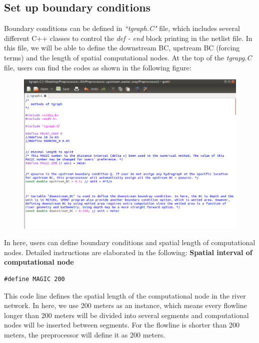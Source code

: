 \documentclass[12pt, letterpaper]{article}
\begin{document}
\begin{appendices}
\begin{flushleft}
\subsection*{Set up boundary conditions}
Boundary conditions can be defined in \emph{``tgraph.C"} file, which includes several different C++ classes to control the \emph{def - end} block printing in the netlist file. In this file, we will be able to define the downstream BC, upstream BC (forcing terms) and the length of spatial computational nodes.
\newline
\newline
At the top of the \emph{tgrapg.C} file, users can find the codes as shown in the following figure:
\begin{figure}[H]
	\centering
	\includegraphics[width = 1.0\textwidth]{figure/tgraph.png} %
	\label{fig:process}%
\end{figure}
\newpage
In here, users can define boundary conditions and spatial length of computational nodes. Detailed instructions are elaborated in the following:
\newline
\newline
\textbf{Spatial interval of computational node}
\lstset{showstringspaces=false}
\begin{lstlisting}[frame=single]
#define MAGIC 200  
\end{lstlisting}
This code line defines the spatial length of the computational node in the river network. In here, we use 200 meters as an instance, which means every flowline longer than 200 meters will be divided into several segments and computational nodes will be inserted between segments. For the flowline is shorter than 200 meters, the preprocessor will define it as 200 meters.\newline

\end{flushleft}
\end{appendices}
\end{document}

